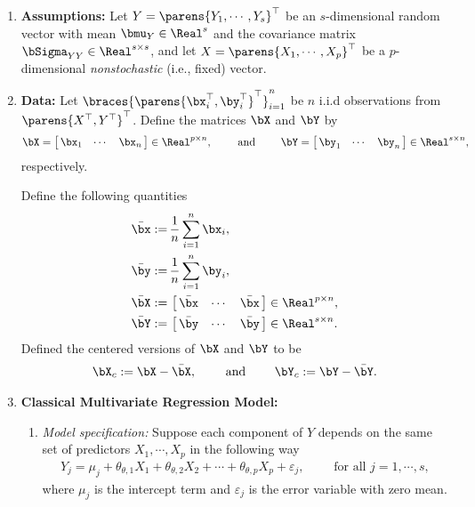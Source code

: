 \documentclass[12pt]{article}
\begin{document}
\begin{enumerate}[label=\textbf{\arabic*.}]

	\item \textbf{Assumptions:} Let $Y = \parens{Y_1, \cdots, Y_s}^\top$ be an $s$-dimensional random vector with mean $\bmu_Y \in \Real^s$ and the covariance matrix $\bSigma_{YY} \in \Real^{s \times s}$, and let $X = \parens{X_1, \cdots, X_p}^\top$ be a $p$-dimensional \textit{nonstochastic} (i.e., fixed) vector. 
	
	\item \textbf{Data:} Let $\braces{\parens{\bx_i^\top, \by_i^\top}^\top}_{i=1}^{n}$ be $n$ i.i.d observations from $\parens{X^\top, Y^\top}^\top$. Define the matrices $\bX$ and $\bY$ by 
	\begin{align*}
		\bX = \begin{bmatrix}
			\, \bx_1 & \cdots & \bx_n \,
		\end{bmatrix} \in \Real^{p \times n}, \qquad \text{ and } \qquad
		\bY = \begin{bmatrix}
			\, \by_1 & \cdots & \by_n \, 
		\end{bmatrix} \in \Real^{s \times n}, 
	\end{align*}
	respectively. 
	
	Define the following quantities 
	\begin{align*}
		\bar{\bx} := & \, \frac{1}{n} \sum_{i=1}^n \bx_i, \\ 
		\bar{\by} := & \, \frac{1}{n} \sum_{i=1}^n \by_i, \\ 
		\bar{\bX} := & \, \begin{bmatrix}
			\, \bar{\bx} & \cdots & \bar{\bx} \, 
		\end{bmatrix} \in \Real^{p \times n}, \\ 
		\bar{\bY} := & \, \begin{bmatrix}
			\, \bar{\by} & \cdots & \bar{\by} \, 
		\end{bmatrix} \in \Real^{s \times n}. 
	\end{align*}
	Defined the centered versions of $\bX$ and $\bY$ to be 
	\begin{align*}
		\bX_c := \bX - \bar{\bX}, \qquad \text{ and } \qquad \bY_c := \bY - \bar{\bY}. 
	\end{align*}
	
	\item \textbf{Classical Multivariate Regression Model:} 
	\begin{enumerate}
		\item \textit{Model specification:} Suppose each component of $Y$ depends on the same set of predictors $X_1, \cdots, X_p$ in the following way 
		\begin{align}\label{eq-multivar-reg-data}
			Y_j = \mu_j + \theta_{\theta,1} X_1 + \theta_{\theta,2} X_2 + \cdots + \theta_{\theta,p} X_p + \varepsilon_j, \qquad \text{ for all } j = 1, \cdots, s, 
		\end{align}
		where $\mu_j$ is the intercept term and $\varepsilon_j$ is the error variable with zero mean. 
		

\end{enumerate}
\end{enumerate}
\end{document}
